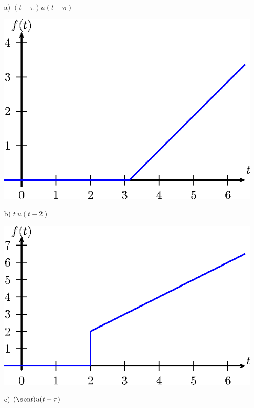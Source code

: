 \begin{resp}
 \begin{itemize}
 \item [a)] $\displaystyle (t-\pi)u(t-\pi)$
 \begin{center}

\includegraphics{cap_trans_int/pics/figura_13}\end{center}
 \item [b)] $\displaystyle t \ u(t-2)$
  \begin{center}

\includegraphics{cap_trans_int/pics/figura_14}\end{center}
 \item [c)] $\displaystyle (\sen t) u(t-\pi)$
 \begin{center}


\end{center}
\end{itemize}
\end{resp}
